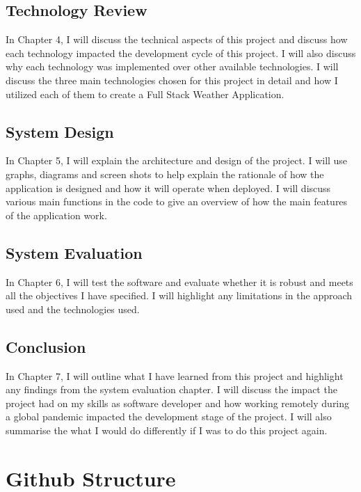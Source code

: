 \subsection{Technology Review}
In Chapter 4, I will discuss the technical aspects of this project and discuss how each technology impacted the development cycle of this project. I will also discuss why each technology was implemented over other available technologies. I will discuss the three main technologies chosen for this project in detail and how I utilized each of them to create a Full Stack Weather Application. 

\subsection{System Design}
In Chapter 5, I will explain the architecture and design of the project. I will use graphs, diagrams and screen shots to help explain the rationale of how the application is designed and how it will operate when deployed. I will discuss various main functions in the code to give an overview of how the main features of the application work.

\subsection{System Evaluation}
In Chapter 6, I will test the software and evaluate whether it is robust and meets all the objectives I have specified. I will highlight any limitations in the approach used and the technologies used.

\subsection{Conclusion}
In Chapter 7, I will outline what I have learned from this project and highlight any findings from the system evaluation chapter. I will discuss the impact the project had on my skills as software developer and how working remotely during a global pandemic impacted the development stage of the project. I will also summarise the what I would do differently if I was to do this project again.

\section{Github Structure}

